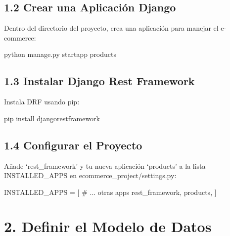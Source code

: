 \documentclass[
  a4paper,
  DIV=11,
  numbers=noendperiod,
  onepage,
  openany]{scrreprt}
\newenvironment{Shaded}{\begin{snugshade}}{\end{snugshade}}
\newcommand{\CommentTok}[1]{\textcolor[rgb]{0.37,0.37,0.37}{#1}}
\newcommand{\ExtensionTok}[1]{\textcolor[rgb]{0.00,0.23,0.31}{#1}}
\newcommand{\NormalTok}[1]{\textcolor[rgb]{0.00,0.23,0.31}{#1}}
\newcommand{\OperatorTok}[1]{\textcolor[rgb]{0.37,0.37,0.37}{#1}}
\newcommand{\StringTok}[1]{\textcolor[rgb]{0.13,0.47,0.30}{#1}}
\begin{document}
\begin{tcolorbox}
\subsection{1.2 Crear una Aplicación
Django}\label{crear-una-aplicaciuxf3n-django}

Dentro del directorio del proyecto, crea una aplicación para manejar el
e-commerce:

\begin{Shaded}
\begin{Highlighting}[]
\ExtensionTok{python}\NormalTok{ manage.py startapp products}
\end{Highlighting}
\end{Shaded}

\subsection{1.3 Instalar Django Rest
Framework}\label{instalar-django-rest-framework}

Instala DRF usando pip:

\begin{Shaded}
\begin{Highlighting}[]
\ExtensionTok{pip}\NormalTok{ install djangorestframework}
\end{Highlighting}
\end{Shaded}

\subsection{1.4 Configurar el Proyecto}\label{configurar-el-proyecto}

Añade `rest\_framework' y tu nueva aplicación `products' a la lista
INSTALLED\_APPS en ecommerce\_project/settings.py:

\begin{Shaded}
\begin{Highlighting}[]
\NormalTok{INSTALLED\_APPS }\OperatorTok{=}\NormalTok{ [}
    \CommentTok{\# ... otras apps}
    \StringTok{\textquotesingle{}rest\_framework\textquotesingle{}}\NormalTok{,}
    \StringTok{\textquotesingle{}products\textquotesingle{}}\NormalTok{,}
\NormalTok{]}
\end{Highlighting}
\end{Shaded}

\section{2. Definir el Modelo de
Datos}\label{definir-el-modelo-de-datos}


\end{tcolorbox}
\end{document}
